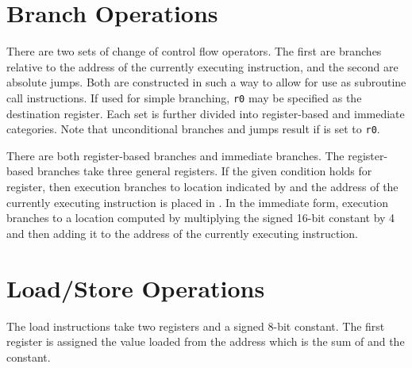 \section{Branch Operations}

There are two sets of change of control flow operators.  The first are
branches relative to the address of the currently executing
instruction, and the second are absolute jumps.  Both are constructed
in such a way to allow for use as subroutine call instructions.
If used for simple branching, {\tt r0} may be specified as the 
destination register.
Each set is further divided into register-based and immediate
categories.  Note that unconditional branches and jumps result if
 is set to {\tt r0}.

There are both register-based branches and immediate branches.
The register-based branches take three general registers.
If the given condition holds for 
register, then execution branches to location indicated by
 and the address of the currently executing instruction
is placed in .
In the immediate form, execution branches to a location computed by
multiplying the signed 16-bit constant by 4 and then adding it to the
address of the currently executing instruction.

\begin{description}

\item	{}
\item	{}
\item	{}
\item	{}
\item	{}
\item	{}
\end{description}

\section{Load/Store Operations}

The load instructions take two registers and a signed 8-bit constant. 
The first register is assigned the value loaded from the address which
is the sum of  and the constant.

\begin{description}

\item	{}
\item	{}

\end{description}

